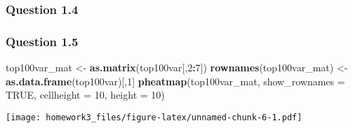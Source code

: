 \documentclass[]{article}
\newenvironment{Shaded}{\begin{snugshade}}{\end{snugshade}}
\newcommand{\DataTypeTok}[1]{\textcolor[rgb]{0.13,0.29,0.53}{#1}}
\newcommand{\DecValTok}[1]{\textcolor[rgb]{0.00,0.00,0.81}{#1}}
\newcommand{\KeywordTok}[1]{\textcolor[rgb]{0.13,0.29,0.53}{\textbf{#1}}}
\newcommand{\NormalTok}[1]{#1}
\newcommand{\OperatorTok}[1]{\textcolor[rgb]{0.81,0.36,0.00}{\textbf{#1}}}
\newcommand{\OtherTok}[1]{\textcolor[rgb]{0.56,0.35,0.01}{#1}}
\newcommand{\StringTok}[1]{\textcolor[rgb]{0.31,0.60,0.02}{#1}}
\begin{document}
\hypertarget{question-1.4}{%
\subsubsection{Question 1.4}\label{question-1.4}}

\begin{Shaded}
\end{Shaded}

\hypertarget{question-1.5}{%
\subsubsection{Question 1.5}\label{question-1.5}}

\begin{Shaded}
\begin{Highlighting}[]
\NormalTok{top100var_mat <-}\StringTok{ }\KeywordTok{as.matrix}\NormalTok{(top100var[,}\DecValTok{2}\OperatorTok{:}\DecValTok{7}\NormalTok{])}
\KeywordTok{rownames}\NormalTok{(top100var_mat) <-}\StringTok{ }\KeywordTok{as.data.frame}\NormalTok{(top100var)[,}\DecValTok{1}\NormalTok{]}
\KeywordTok{pheatmap}\NormalTok{(top100var_mat, }\DataTypeTok{show_rownames =} \OtherTok{TRUE}\NormalTok{, }\DataTypeTok{cellheight =} \DecValTok{10}\NormalTok{, }\DataTypeTok{height =} \DecValTok{10}\NormalTok{)}
\end{Highlighting}
\end{Shaded}

\texttt{[image: homework3\_files/figure-latex/unnamed-chunk-6-1.pdf]}
\end{document}
